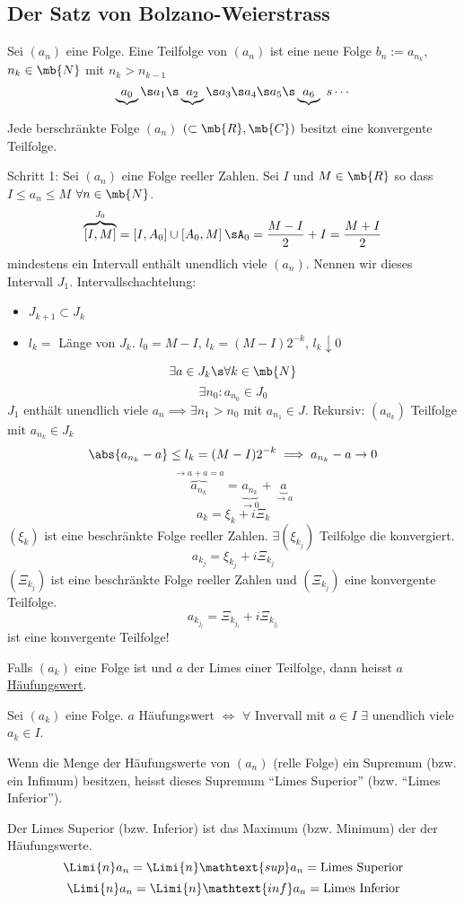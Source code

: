 \subsection{Der Satz von Bolzano-Weierstrass}
\begin{Def}
  Sei $(a_n)$ eine Folge. Eine Teilfolge von $(a_n)$ ist eine neue Folge $b_n:= a_{n_k}$, $n_k\in\mb{N}$ mit $n_k>n_{k-1}$
  \[\underbrace{a_0}\s a_1\s\underbrace{a_2}\s a_3\s a_4 \s a_5 \s\underbrace{a_6}\ s \cdots\]
\end{Def}
\begin{Sat}
  Jede berschränkte Folge $(a_n)$ $(\subset\mb{R}, \mb{C})$ besitzt eine konvergente Teilfolge.
\end{Sat}
\begin{Bew}
  Schritt 1: Sei $(a_n)$ eine Folge reeller Zahlen. Sei $I$ und $M\in\mb{R}$ so dass $I\leq a_n\leq M$ $\forall n\in\mb{N}$.
  \[\overbrace{\left[ I,M \right]}^{J_0}=\left[ I,A_0 \right]\cup \left[ A_0, M \right]\sA_0=\frac{M-I}{2}+I=\frac{M+I}{2}\]
  mindestens ein Intervall enthält unendlich viele $(a_n)$. Nennen wir dieses Intervall $J_1$.
  Intervallschachtelung:
  \begin{itemize}
    \item $J_{k+1}\subset J_k$
    \item $l_k=$ Länge von $J_k$. $l_0=M-I$, $l_k=(M-I)2^{-k}$, $l_k\downarrow 0$
  \end{itemize}
  \[\exists a\in J_k\s\forall k\in\mb{N}\]
  \[\exists n_0: a_{n_0}\in J_0\]
  $J_1$ enthält unendlich viele $a_n\implies \exists n_1>n_0$ mit $a_{n_1}\in J$. Rekursiv: $(a_{a_k})$ Teilfolge mit $a_{n_k}\in J_k$
  \[\abs{a_{n_k}-a}\leq l_k=(M-I)2^{-k}\implies a_{n_k}-a\to 0\]
  \[\overbrace{a_{n_k}}^{\to a+a=a}=\underbrace{a_{n_k}}_{\to 0}+\underbrace{a}_{\to a}\]
  \[a_k=\xi_k+i\Xi_k\]
  $(\xi_k)$ ist eine beschränkte Folge reeller Zahlen. $\exists (\xi_{k_j})$ Teilfolge die konvergiert.
  \[a_{k_j}=\xi_{k_j}+i\Xi_{k_j}\]
  $(\Xi_{k_j})$ ist eine beschränkte Folge reeller Zahlen und $(\Xi_{k_j})$ eine konvergente Teilfolge.
  \[a_{k_{j_l}}=\Xi_{k_{j_l}}+i\Xi_{k_{j_l}}\]
  ist eine konvergente Teilfolge!
\end{Bew}
\begin{Def}
  Falls $(a_k)$ eine Folge ist und $a$ der Limes einer Teilfolge, dann heisst $a$ \ul{Häufungswert}.
\end{Def}
\begin{Lem}
  Sei $(a_k)$ eine Folge. $a$ Häufungswert $\iff$ $\forall$ Invervall mit $a\in I$ $\exists$ unendlich viele $a_k\in I$.
\end{Lem}
\begin{Def}
  Wenn die Menge der Häufungswerte von $(a_n)$ (relle Folge) ein Supremum (bzw. ein Infimum) besitzen, heisst dieses Supremum ``Limes Superior'' (bzw. ``Limes Inferior'').
\end{Def}
\begin{Lem}
  Der Limes Superior (bzw. Inferior) ist das Maximum (bzw. Minimum) der der Häufungswerte.
  \[\Limi{n}a_n=\Limi{n}\mathtext{sup} a_n=\text{Limes Superior}\] %
  \[\Limi{n}a_n=\Limi{n}\mathtext{inf} a_n=\text{Limes Inferior}\]
\end{Lem}

